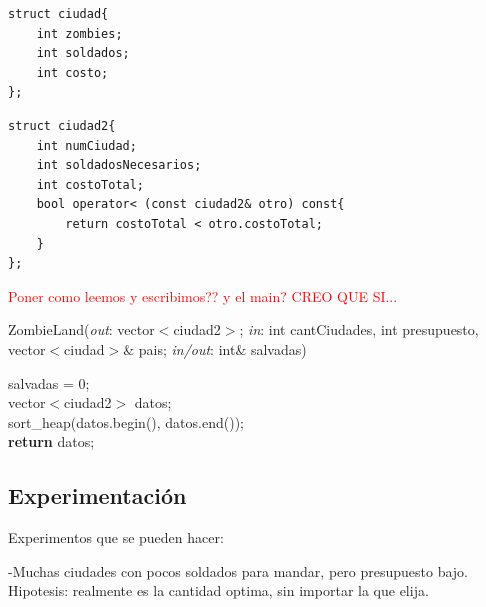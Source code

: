 \documentclass[a4paper]{article}
\begin{document}
	\begin{codesnippet}
	\begin{verbatim}
struct ciudad{
    int zombies;
    int soldados;
    int costo;
};
	\end{verbatim}
	\end{codesnippet}

	\begin{codesnippet}
	\begin{verbatim}
struct ciudad2{
    int numCiudad;
    int soldadosNecesarios;
    int costoTotal;
    bool operator< (const ciudad2& otro) const{
        return costoTotal < otro.costoTotal;
    }
};
	\end{verbatim}
	\end{codesnippet}

\textcolor{red}{Poner como leemos y escribimos?? y el main? CREO QUE SI...}


\begin{algorithm}[h!]
\caption{ZombieLand(\textit{out}: vector$<$ciudad2$>$; \textit{in}: int cantCiudades, int presupuesto, vector$<$ciudad$>$\& pais; \textit{in/out}:  int\& salvadas)}
salvadas = 0;\\
vector$<$ciudad2$>$ datos;\\
sort_heap(datos.begin(), datos.end());\\
\textbf{return} datos;
\end{algorithm}

\newpage
\subsection{Experimentaci\'on}

\noindent Experimentos que se pueden hacer:

-Muchas ciudades con pocos soldados para mandar, pero presupuesto bajo. Hipotesis: realmente es la cantidad optima, sin importar la que elija.
\end{document}
